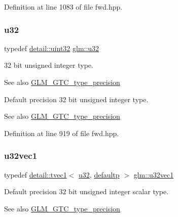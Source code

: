 Definition at line 1083 of file fwd.\+hpp.

\mbox{\label{group__gtc__type__precision_ga54e837745059fd29017bed71cfa0a8db}} 
\subsubsection{\texorpdfstring{u32}{u32}}
{\footnotesize\ttfamily typedef \hyperlink{namespaceglm_1_1detail_ade6cfbf377022aaa391af8cd50489222}{detail\+::uint32} \hyperlink{group__gtc__type__precision_ga54e837745059fd29017bed71cfa0a8db}{glm\+::u32}}

32 bit unsigned integer type. \begin{DoxySeeAlso}{See also}
\hyperlink{group__gtc__type__precision}{G\+L\+M\+\_\+\+G\+T\+C\+\_\+type\+\_\+precision}
\end{DoxySeeAlso}
Default precision 32 bit unsigned integer type. \begin{DoxySeeAlso}{See also}
\hyperlink{group__gtc__type__precision}{G\+L\+M\+\_\+\+G\+T\+C\+\_\+type\+\_\+precision} 
\end{DoxySeeAlso}


Definition at line 919 of file fwd.\+hpp.

\mbox{\label{group__gtc__type__precision_gac8263c8c0bb36bc5c3d109f508e0fb41}} 
\subsubsection{\texorpdfstring{u32vec1}{u32vec1}}
{\footnotesize\ttfamily typedef \hyperlink{structglm_1_1detail_1_1tvec1}{detail\+::tvec1}$<$ \hyperlink{group__gtc__type__precision_ga54e837745059fd29017bed71cfa0a8db}{u32}, \hyperlink{namespaceglm_a0f04f086094c747d227af4425893f545a9d21ccd8b5a009ec7eb7677befc3bf51}{defaultp} $>$ \hyperlink{group__gtc__type__precision_gac8263c8c0bb36bc5c3d109f508e0fb41}{glm\+::u32vec1}}

Default precision 32 bit unsigned integer scalar type. \begin{DoxySeeAlso}{See also}
\hyperlink{group__gtc__type__precision}{G\+L\+M\+\_\+\+G\+T\+C\+\_\+type\+\_\+precision} 
\end{DoxySeeAlso}


